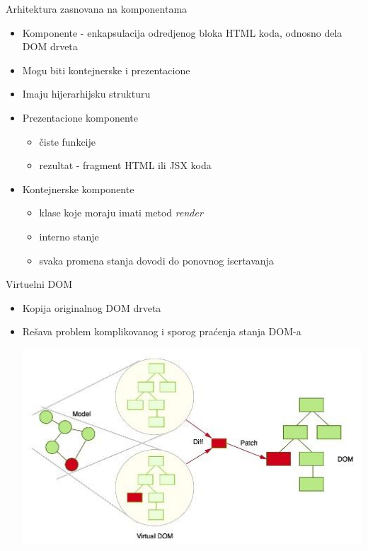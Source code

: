 \documentclass{beamer}
\begin{document}
\begin{frame}{Arhitektura zasnovana na komponentama}
        \begin{itemize}
            \item Komponente - enkapsulacija odredjenog bloka HTML koda, odnosno dela DOM drveta
            \item Mogu biti kontejnerske i prezentacione
            \item Imaju hijerarhijsku strukturu	
            \item Prezentacione komponente
            	\begin{itemize}
            		\item čiste funkcije
            		\item rezultat - fragment HTML ili JSX koda 
            	\end{itemize}
            \item Kontejnerske komponente
            	\begin{itemize}
            		\item klase koje moraju imati metod \emph{render}
            		\item interno stanje
            		\item svaka promena stanja dovodi do ponovnog iscrtavanja 
            	\end{itemize}
        \end{itemize}
\end{frame}
\begin{frame}{Virtuelni DOM}
    \begin{itemize}
    	\item Kopija originalnog DOM drveta
    	\item Rešava problem komplikovanog i sporog praćenja stanja DOM-a
    	
        \includegraphics[scale=0.5]{./resources/vdom.jpg}
    \end{itemize}
\end{frame}
\end{document}
